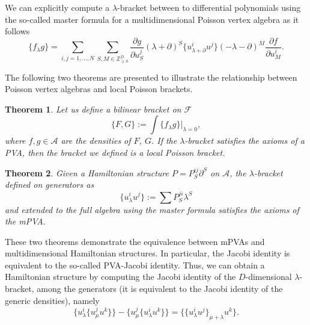 \documentclass[10pt,a4paper]{amsart}
\numberwithin{equation}{section}
\newtheorem{Theorem}{Theorem}[section]
\begin{document}
We can explicitly compute a $\lambda$-bracket between to differential polynomials using the so-called master formula for a multidimensional Poisson vertex algebra \cite{casati2015deformations} as it follows
\begin{equation}\label{eq:master}
\lbrace f_{\lambda}g\rbrace=\sum_{i,j=1,\dots,N}\sum_{S,M\in \mathbb{Z}^D_{\geq0}}\frac{\partial g}{\partial u^j_S}(\lambda+\partial)^S\big\lbrace u^i_{\lambda+\partial}u^j\big\rbrace(-\lambda-\partial)^M\frac{\partial f}{\partial u^i_M}.
\end{equation}

The following two theorems \cite{casati2015deformations} are presented to illustrate the relationship between Poisson vertex algebras and local Poisson brackets.
\begin{Theorem}
Let us define a bilinear bracket on $\mathcal{F}$
\[
\lbrace F,G\rbrace:=\int {\lbrace f_{\lambda} g\rbrace}|_{\lambda=0},
\]
where $f,g\in \mathcal{A}$ are the densities of $F$, $G$.
If the $\lambda$-bracket satisfies the axioms of a PVA, then the bracket we defined is a local Poisson bracket.
\end{Theorem}
\begin{Theorem}
Given a Hamiltonian structure $P=P^{ij}_S\partial^S$ on $\mathcal{A}$,
the $\lambda$-bracket defined on generators as
\[
\big\lbrace u^i_{\lambda}u^j\big\rbrace:=\sum P^{ji}_S\lambda^S
\]
and extended to the full algebra using the master formula satisfies the axioms of the mPVA.
\end{Theorem}
These two theorems demonstrate the equivalence between mPVAs and multidimensional Hamiltonian structures. In particular, the Jacobi identity is equivalent to the so-called PVA-Jacobi identity. Thus, we can obtain a Hamiltonian structure by computing the Jacobi identity of the $D$-dimensional $\lambda$-bracket, among the generators (it is equivalent to the Jacobi identity of the generic densities), namely
\begin{equation}\label{PJ}
\big\lbrace u^i_{\lambda}\big\lbrace u^j_{\mu} u^k\big\rbrace\big\rbrace -\big\lbrace u^j_{\mu}\big\lbrace u^i_{\lambda} u^k\big\rbrace\big\rbrace =\big\lbrace\big\lbrace u^i_{\lambda} u^j\big\rbrace_{\mu +\lambda}u^k\big\rbrace.
\end{equation}
\end{document}
